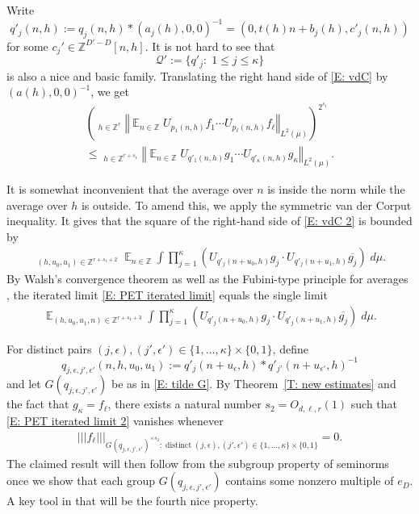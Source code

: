 \documentclass[11pt]{amsart}
\theoremstyle{definition}
\DeclareMathOperator*{\oE}{\overline{\mathbb{E}}}
\DeclareMathOperator*{\E}{\mathbb{E}}
\newcommand{\N}{{\mathbb N}}
\newcommand{\Z}{{\mathbb Z}}
\newcommand{\CQ}{{\mathcal Q}}
\newcommand{\eps}{\epsilon}
\newcommand{\norm}[1]{\left\Vert #1\right\Vert}
\newcommand{\nnorm}[1]{\lvert\!|\!| #1|\!|\!\rvert}
\newcommand{\inv}{^{-1}}
\newcommand{\1}{{\mathbf{1}}}
\newcommand{\brac}[1]{\mathopen{}\left( #1 \mathclose{}\right)}
\begin{document}
Write
$$q'_{j}(n,h):=q_{j}(n,h)\ast (a_j(h),0,0)^{-1}=(0,t(h)n+b_{j}(h),c'_{j}(n,h))$$
for some $c_j'\in \Z^{D'-D}[n,h]$.
It is not hard to see that 
$$\CQ':=\{q'_{j}\colon\; 1\leq j\leq \kappa\}$$
is also a nice and basic family.
  Translating the right hand side of \eqref{E: vdC} by $(a(h),0,0)\inv$, we get
        \begin{multline}\label{E: vdC 2}
     \brac{\oE_{h\in\Z^{r}}\norm{\E_{n\in\Z}U_{p_1(n,h)}f_1\cdots U_{p_\ell(n,h)}f_\ell}_{L^2(\mu)}}^{2^{s_1}}\\
    \leq \oE_{h\in \Z^{r+{s_1}}}\norm{\E_{n\in\Z}U_{q'_1(n,h)}g_{1}\cdots U_{q'_\kappa(n,h)}g_\kappa}_{L^2(\mu)}.
    \end{multline}
 
 It is somewhat inconvenient that the average over $n$ is inside the norm while the average over $h$ is outside. To amend this, we apply the symmetric van der Corput inequality.
 It gives that
    the square of the right-hand side of \eqref{E: vdC 2}   is bounded by
    \begin{align}\label{E: PET iterated limit}
        \oE_{(h,u_0,u_1)\in\Z^{r+{s_1}+2}}\E_{n\in\Z}\int \prod_{j=1}^{\kappa}\brac{U_{q'_{j}(n+u_{0},h)}g_{j}\cdot U_{q'_{j}(n+u_{1},h)}\overline{g_{j}}}\; d\mu.
    \end{align}
    By Walsh's convergence theorem \cite{W12} as well as the Fubini-type principle for averages \cite[Lemma~1.1]{BL15}, the iterated limit \eqref{E: PET iterated limit} equals the single limit
    \begin{align}\label{E: PET iterated limit 2}
      \E_{(h,u_{0},u_{1},n)\in\Z^{r+{s_1}+3}}\int \prod_{j=1}^{\kappa}\brac{U_{q'_{j}(n+u_{0},h)}g_{j}\cdot U_{q'_{j}(n+u_{1},h)}\overline{g_j}}\; d\mu.
    \end{align}

For distinct pairs $(j,\eps), (j',\eps')\in\{1,\dots,\kappa\}\times \{0,1\}$, define
$$q_{j,\eps,j',\eps'}(n,h,u_{0},u_{1}):=q'_{j}(n+u_{\eps},h)\ast q'_{j'}(n+u_{\eps'},h)^{-1}$$
and let $G(q_{j,\eps,j',\eps'})$ be as in \eqref{E: tilde G}. By Theorem~\ref{T: new estimates} and the fact that {$g_\kappa = f_\ell$},
there exists a natural number $s_2=O_{d,\ell,r}(1)$ such that \eqref{E: PET iterated limit 2} vanishes whenever
\begin{align*}
    \nnorm{f_\ell}_{G(q_{j,\eps,j',\eps'})^{\times s_2}\colon\; \textrm{distinct}\; (j,\eps), (j',\eps')\in\{1,\dots,\kappa\}\times \{0,1\}} = 0.
\end{align*}
The claimed result will then follow from the subgroup property of seminorms once we show that each group $G(q_{j,\eps,j',\eps'})$ contains {some nonzero multiple of} $e_D$. A key tool in that will be the fourth nice property.
\end{document}
